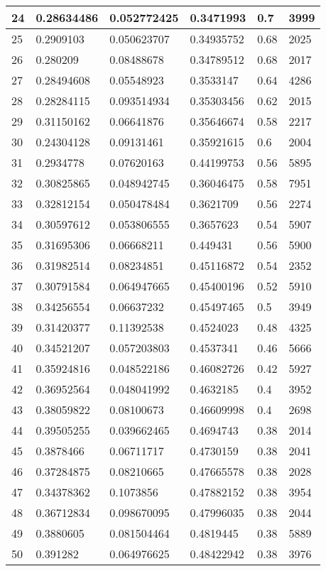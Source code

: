 \begin{longtable}{|l|l|l|l|l|l|}
24 & 0.28634486 & 0.052772425 & 0.3471993 & 0.7 & 3999 \\ \hline 
25 & 0.2909103 & 0.050623707 & 0.34935752 & 0.68 & 2025 \\ \hline 
26 & 0.280209 & 0.08488678 & 0.34789512 & 0.68 & 2017 \\ \hline 
27 & 0.28494608 & 0.05548923 & 0.3533147 & 0.64 & 4286 \\ \hline 
28 & 0.28284115 & 0.093514934 & 0.35303456 & 0.62 & 2015 \\ \hline 
29 & 0.31150162 & 0.06641876 & 0.35646674 & 0.58 & 2217 \\ \hline 
30 & 0.24304128 & 0.09131461 & 0.35921615 & 0.6 & 2004 \\ \hline 
31 & 0.2934778 & 0.07620163 & 0.44199753 & 0.56 & 5895 \\ \hline 
32 & 0.30825865 & 0.048942745 & 0.36046475 & 0.58 & 7951 \\ \hline 
33 & 0.32812154 & 0.050478484 & 0.3621709 & 0.56 & 2274 \\ \hline 
34 & 0.30597612 & 0.053806555 & 0.3657623 & 0.54 & 5907 \\ \hline 
35 & 0.31695306 & 0.06668211 & 0.449431 & 0.56 & 5900 \\ \hline 
36 & 0.31982514 & 0.08234851 & 0.45116872 & 0.54 & 2352 \\ \hline 
37 & 0.30791584 & 0.064947665 & 0.45400196 & 0.52 & 5910 \\ \hline 
38 & 0.34256554 & 0.06637232 & 0.45497465 & 0.5 & 3949 \\ \hline 
39 & 0.31420377 & 0.11392538 & 0.4524023 & 0.48 & 4325 \\ \hline 
40 & 0.34521207 & 0.057203803 & 0.4537341 & 0.46 & 5666 \\ \hline 
41 & 0.35924816 & 0.048522186 & 0.46082726 & 0.42 & 5927 \\ \hline 
42 & 0.36952564 & 0.048041992 & 0.4632185 & 0.4 & 3952 \\ \hline 
43 & 0.38059822 & 0.08100673 & 0.46609998 & 0.4 & 2698 \\ \hline 
44 & 0.39505255 & 0.039662465 & 0.4694743 & 0.38 & 2014 \\ \hline 
45 & 0.3878466 & 0.06711717 & 0.4730159 & 0.38 & 2041 \\ \hline 
46 & 0.37284875 & 0.08210665 & 0.47665578 & 0.38 & 2028 \\ \hline 
47 & 0.34378362 & 0.1073856 & 0.47882152 & 0.38 & 3954 \\ \hline 
48 & 0.36712834 & 0.098670095 & 0.47996035 & 0.38 & 2044 \\ \hline 
49 & 0.3880605 & 0.081504464 & 0.4819445 & 0.38 & 5889 \\ \hline 
50 & 0.391282 & 0.064976625 & 0.48422942 & 0.38 & 3976 \\ \hline 
\end{longtable}